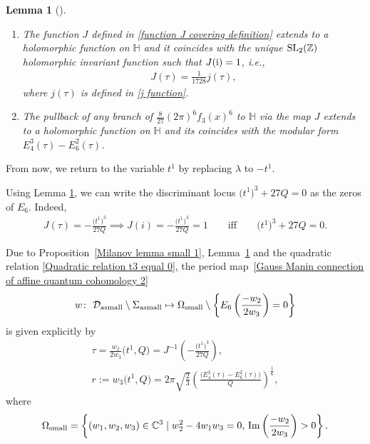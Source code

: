 \documentclass[pdftex]{sigma}
\numberwithin{equation}{section}
\newtheorem{Lemma}[Theorem]{Lemma}
\begin{document}
\begin{Lemma}[{\cite{Milanov}}]\label{Milanov lemma small 2}\quad
\begin{enumerate}\itemsep=0pt

\item[$(1)$]
The function $J$ defined in \eqref{function J covering definition} extends to a holomorphic function on $\mathbb{H}$ and it coincides with the unique ${\rm SL}_2(\mathbb{Z})$ holomorphic invariant function such that $J({\rm i})=1$, i.e.,
\begin{gather}\label{J function other normalization}
J(\tau)=\frac{1}{1728}j(\tau),
\end{gather}
where $j(\tau)$ is defined in \eqref{j function}.
\item[$(2)$]
The pullback of any branch of $\frac{8}{27}(2\pi)^6f_3(x)^{6}$ to $\mathbb{H}$ via the map $J$ extends to a holomorphic function on $\mathbb{H}$ and its coincides with the modular form $E_4^3(\tau)-E_6^2(\tau)$.
\end{enumerate}

\end{Lemma}
From now, we return to the variable $t^1$ by replacing $\lambda$ to $-t^1$.

Using Lemma \ref{Milanov lemma small 2}, we can write the discriminant locus $\bigl(t^1\bigr)^3+27Q=0$ as the zeros of $E_6$. Indeed,
\begin{gather*}
J(\tau)=-\frac{\bigl(t^1\bigr)^3}{27Q} \implies J(i)=-\frac{\bigl(t^1\bigr)^3}{27Q}=1 \qquad \text{iff} \qquad \bigl(t^1\bigr)^3+27Q=0.
\end{gather*}

Due to Proposition~\ref{Milanov lemma small 1}, Lemma~\ref{Milanov lemma small 2} and the quadratic relation \eqref{Quadratic relation t3 equal 0}, the period map~\eqref{Gauss Manin connection of affine quantum cohomology 2}
\begin{gather*}
w\colon\ \mathcal{D}_{\rm asmall}\setminus{\Sigma_{\rm asmall}}\mapsto \Omega_{\rm small}\setminus\left\{ E_6\left(\frac{-w_2}{2w_3}\right)=0\right\}
\end{gather*}
 is given explicitly by
\begin{gather}
\tau=\frac{w_2}{2w_3}\bigl(t^1,Q\bigr)=J^{-1}\left( -\frac{\bigl(t^1\bigr)^3}{27Q} \right),\nonumber\\
r:=w_3\bigl(t^1,Q\bigr)=2\pi\sqrt{\frac{2}{3}}\left(\frac{\bigl(E_4^3(\tau)-E_6^2(\tau) \bigr)}{Q}\right)^{\frac{1}{6}},\label{period map functions}
\end{gather}
where
\[%
\Omega_{\rm small}=\left\{ (w_1,w_2,w_3) \in \mathbb{C}^3 \mid w_2^2-4w_1w_3=0,\, \operatorname{Im}\left(\frac{-w_2}{2w_3}\right)> 0\right\}.
\]
\end{document}
